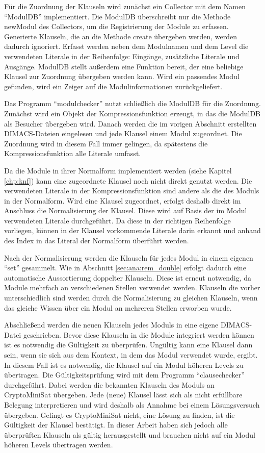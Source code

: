 Für die Zuordnung der Klauseln wird zunächst ein Collector mit dem Namen "`ModulDB"' implementiert. Die ModulDB überschreibt nur die Methode newModul des Collectors,
um die Registrierung der Module zu erfassen. Generierte Klauseln, die an die Methode create übergeben werden, werden dadurch ignoriert. Erfasst werden neben dem
Modulnamen und dem Level die verwendeten Literale in der Reihenfolge: Eingänge, zusätzliche Literale und Ausgänge. ModulDB stellt außerdem eine Funktion bereit,
der eine beliebige Klausel zur Zuordnung übergeben werden kann. Wird ein passendes Modul gefunden, wird ein Zeiger auf die Modulinformationen zurückgeliefert.

Das Programm "`modulchecker"' nutzt schließlich die ModulDB für die Zuordnung. Zunächst wird ein Objekt der Kompressionsfunktion erzeugt, in das die ModulDB als
Besucher übergeben wird. Danach werden die im vorigen Abschnitt erstellten DIMACS-Dateien eingelesen und jede Klausel einem Modul zugeordnet. Die Zuordnung wird
in diesem Fall immer gelingen, da spätestens die Kompressionsfunktion alle Literale umfasst.

Da die Module in ihrer Normalform implementiert werden (siehe Kapitel \ref{chp:knf}) kann eine zugeordnete Klausel noch nicht direkt genutzt werden.
Die verwendeten Literale in der Kompressionsfunktion sind andere als die des Moduls in der Normalform. Wird eine Klausel zugeordnet, erfolgt deshalb
direkt im Anschluss die Normalisierung der Klausel. Diese wird auf Basis der im Modul verwendeten Literale durchgeführt. Da diese in der richtigen
Reihenfolge vorliegen, können in der Klausel vorkommende Literale darin erkannt und anhand des Index in das Literal der Normalform überführt werden.

Nach der Normalisierung werden die Klauseln für jedes Modul in einem eigenen "`set"' gesammelt. Wie in Abschnitt \ref{sec:ana:rem_double} erfolgt
dadurch eine automatische Aussortierung doppelter Klauseln. Diese ist erneut notwendig, da Module mehrfach an verschiedenen Stellen verwendet werden.
Klauseln die vorher unterschiedlich sind werden durch die Normalisierung zu gleichen Klauseln, wenn das gleiche Wissen über ein Modul an mehreren
Stellen erworben wurde.

Abschließend werden die neuen Klauseln jedes Moduls in eine eigene DIMACS-Datei geschrieben. Bevor diese Klauseln in die Module integriert werden können ist
es notwendig die Gültigkeit zu überprüfen. Ungültig kann eine Klausel dann sein, wenn sie sich aus dem Kontext, in dem das Modul verwendet wurde, ergibt.
In diesem Fall ist es notwendig, die Klausel auf ein Modul höheren Levels zu übertragen. Die Gültigkeitsprüfung wird mit dem Programm "`clausechecker"'
durchgeführt. Dabei werden die bekannten Klauseln des Moduls an CryptoMiniSat übergeben. Jede (neue) Klausel lässt sich als nicht erfüllbare Belegung
interpretieren und wird deshalb als Annahme bei einem Lösungsversuch übergeben. Gelingt es CryptoMiniSat nicht, eine Lösung zu finden, ist die Gültigkeit
der Klausel bestätigt. In dieser Arbeit haben sich jedoch alle überprüften Klauseln als gültig herausgestellt und brauchen nicht auf ein Modul höheren
Levels übertragen werden.

